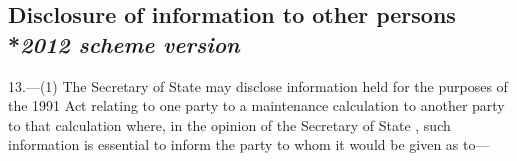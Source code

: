\documentclass[12pt,a4paper]{article}
\begin{document}

\subsection[13. Disclosure of information to other persons --- \emph{2012 scheme version}]{Disclosure of information to other persons\\*\emph{2012 scheme version}}

13.---(1)  The 
Secretary of State  %
may disclose information held for the purposes of the 1991 Act relating to one party to a maintenance calculation to another party to that calculation where, in the opinion of the 
Secretary of State%
, such information is essential to inform the party to whom it would be given as to—
\end{document}
